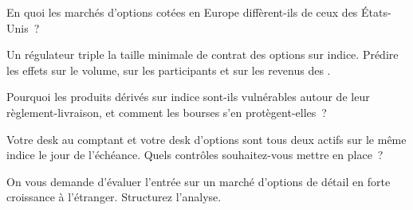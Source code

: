 \begin{interviewq}\label{iq:m1:options-markets-europe-asia:2}
En quoi les marchés d'options cotées en Europe diffèrent-ils de ceux des
États-Unis~?
\end{interviewq}

\begin{interviewq}\label{iq:m1:options-markets-europe-asia:3}
Un régulateur triple la taille minimale de contrat des options sur indice. Prédire
les effets sur le volume, sur les participants et sur les revenus des .
\end{interviewq}

\begin{interviewq}\label{iq:m1:options-markets-europe-asia:4}
Pourquoi les produits dérivés sur indice  sont-ils vulnérables
autour de leur règlement-livraison, et comment les bourses s'en protègent-elles~?
\end{interviewq}

\begin{interviewq}\label{iq:m1:options-markets-europe-asia:5}
Votre desk au comptant et votre desk d'options sont tous deux actifs sur le même
indice le jour de l'échéance. Quels contrôles souhaitez-vous mettre en place~?
\end{interviewq}

\begin{interviewq}\label{iq:m1:options-markets-europe-asia:6}
On vous demande d'évaluer l'entrée sur un marché d'options de détail en forte
croissance à l'étranger. Structurez l'analyse.
\end{interviewq}
